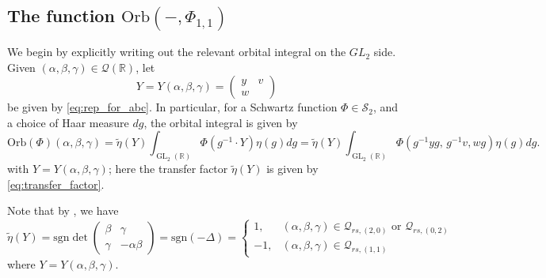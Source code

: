 \documentclass[reqno, 11pt]{amsart} %
\numberwithin{equation}{section}
\theoremstyle{plain}
\theoremstyle{definition}
\theoremstyle{remark}
\newcommand{\bbR}{\mathbb R}
\newcommand{\calQ}{\mathcal Q}
\DeclareMathOperator{\GL}{GL}
\newcommand{\Orb}{\mathrm{Orb}}
\begin{document}
\subsection{The function $\Orb(-,\Phi_{1,1})$}
We begin by explicitly writing out the relevant orbital integral on the $GL_2$ side.
Given $(\alpha,\beta,\gamma) \in \mathcal Q(\bbR)$, let
\[ Y  = Y(\alpha,\beta,\gamma)= \begin{pmatrix} y & v \\ w &  \end{pmatrix} \]
be given by \eqref{eq:rep_for_abc}. In particular, for a Schwartz function $\Phi \in \mathcal S_2$,  and a choice of Haar measure $dg$, the orbital integral is given by
\[
\Orb(\Phi)(\alpha,\beta,\gamma)  = \tilde \eta(Y) \int_{\GL_2(\bbR)}  \Phi(g^{-1} \cdot Y) \eta(g) dg = \tilde \eta(Y) \int_{\GL_2(\bbR)} \Phi \left( g^{-1} y g, \, g^{-1} v, wg \right) \eta(g) dg.
\]
with $Y= Y(\alpha,\beta,\gamma)$; here the transfer factor $\tilde \eta(Y) $ is given by  \eqref{eq:transfer_factor}.

Note that by , we have
\begin{equation} \label{eqn:transfer factor gl2 explicit}
\tilde \eta (Y) = \mathrm{sgn} \det \begin{pmatrix} \beta & \gamma \\ \gamma & - \alpha \beta \end{pmatrix} =  \mathrm{sgn}( - \Delta) = \begin{cases} 1, & (\alpha, \beta, \gamma) \in \calQ_{rs, (2,0)} \text{ or } \calQ_{rs, (0,2)}  \\
-1, & (\alpha,\beta,\gamma) \in \calQ_{rs, (1,1)}
\end{cases}
\end{equation}
where $Y = Y(\alpha,\beta,\gamma)$.
\end{document}
